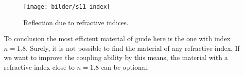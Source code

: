 \begin{figure}[!ht]
\centering
\texttt{[image: bilder/s11\_index]}
\caption{Reflection due to refractive indices.}
\label{fig:s11_index}
\end{figure}

To conclusion the most efficient material of guide here is the one with index $n=1.8$.  Surely, it is not possible to find the material of any refractive index. If we want to improve the coupling ability by this means, the material with a refractive index close to $n=1.8$ can be optional.
